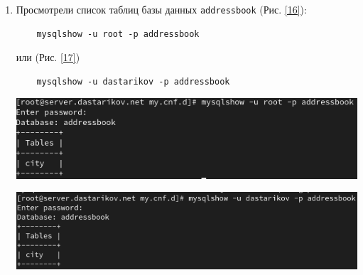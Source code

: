 \begin{enumerate}
\item Просмотрели список таблиц базы данных \texttt{addressbook} (Рис. \ref{16}):
  \begin{verbatim}
    mysqlshow -u root -p addressbook
  \end{verbatim}
  или (Рис. \ref{17})
  \begin{verbatim}
    mysqlshow -u dastarikov -p addressbook
  \end{verbatim}

\begin{center}
    \centering
    \includegraphics[width=\textwidth]{../images/image16.png}
    \label{16}
\end{center}

\begin{center}
    \centering
    \includegraphics[width=\textwidth]{../images/image17.png}
    \label{17}
\end{center}

\end{enumerate}
